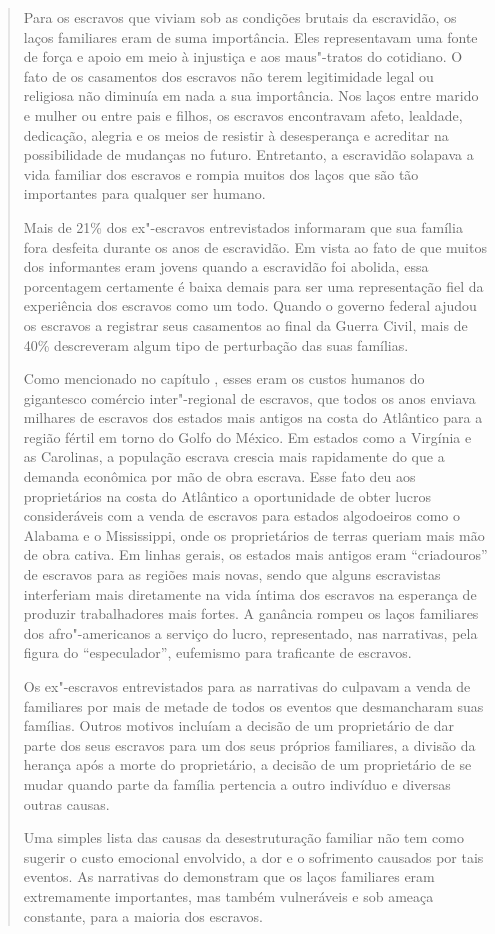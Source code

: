 \begin{quote}
Para os escravos que viviam sob as condições brutais da
escravidão, os laços familiares eram de suma importância. Eles
representavam uma fonte de força e apoio em meio à injustiça e aos
maus"-tratos do cotidiano. O fato de os casamentos dos escravos não terem
legitimidade legal ou religiosa não diminuía em nada a sua importância.
Nos laços entre marido e mulher ou entre pais e filhos, os escravos
encontravam afeto, lealdade, dedicação, alegria e os meios de resistir à
desesperança e acreditar na possibilidade de mudanças no futuro.
Entretanto, a escravidão solapava a vida familiar dos escravos e rompia
muitos dos laços que são tão importantes para qualquer ser humano.

Mais de 21\% dos ex"-escravos entrevistados informaram que sua
família fora desfeita durante os anos de escravidão. Em vista ao fato de
que muitos dos informantes eram jovens quando a escravidão foi abolida,
essa porcentagem certamente é baixa demais para ser uma representação
fiel da experiência dos escravos como um todo. Quando o governo federal
ajudou os escravos a registrar seus casamentos ao final da Guerra Civil,
mais de 40\% descreveram algum tipo de perturbação das suas famílias. 

Como mencionado no capítulo , esses eram os custos humanos do
gigantesco comércio inter"-regional de escravos, que todos os anos
enviava milhares de escravos dos estados mais antigos na costa do
Atlântico para a região fértil em torno do Golfo do México. Em estados
como a Virgínia e as Carolinas, a população escrava crescia mais
rapidamente do que a demanda econômica por mão de obra escrava. Esse
fato deu aos proprietários na costa do Atlântico a oportunidade de obter
lucros consideráveis com a venda de escravos para estados algodoeiros
como o Alabama e o Mississippi, onde os proprietários de terras queriam
mais mão de obra cativa. Em linhas gerais, os estados mais antigos eram
``criadouros'' de escravos para as regiões mais novas, sendo que alguns
escravistas interferiam mais diretamente na vida íntima dos escravos na
esperança de produzir trabalhadores mais fortes. A ganância rompeu os
laços familiares dos afro"-americanos a serviço do lucro, representado,
nas narrativas, pela figura do ``especulador'', eufemismo para
traficante de escravos.

Os ex"-escravos entrevistados para as narrativas do  culpavam a
venda de familiares por mais de metade de todos os eventos que
desmancharam suas famílias. Outros motivos incluíam a decisão de um
proprietário de dar parte dos seus escravos para um dos seus próprios
familiares, a divisão da herança após a morte do proprietário, a decisão
de um proprietário de se mudar quando parte da família pertencia a outro
indivíduo e diversas outras causas.

Uma simples lista das causas da desestruturação familiar não tem
como sugerir o custo emocional envolvido, a dor e o sofrimento causados
por tais eventos. As narrativas do  demonstram que os laços
familiares eram extremamente importantes, mas também vulneráveis e sob
ameaça constante, para a maioria dos escravos.
\end{quote}

